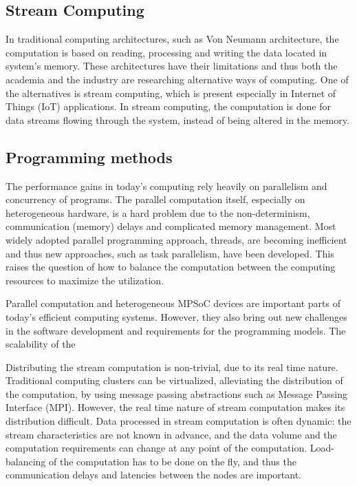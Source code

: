 \subsection{Stream Computing}
In traditional computing architectures, such as Von Neumann architecture, the computation is based on reading, processing and writing the data located in system's memory. These architectures have their limitations and thus both the academia and the industry are researching alternative ways of computing. One of the alternatives is stream computing, which is present especially in Internet of Things (IoT) applications. In stream computing, the computation is done for data streams flowing through the system, instead of being altered in the memory.

\subsection{Programming methods}
The performance gains in today's computing rely heavily on parallelism and concurrency of programs. The parallel computation itself, especially on heterogeneous hardware, is a hard problem due to the non-determinism, communication (memory) delays and complicated memory management. Most widely adopted  parallel programming approach, threads, are becoming inefficient and thus new approaches, such as task parallelism, have been developed. This raises the question of how to balance the computation between the computing resources to maximize the utilization.

Parallel computation and heterogeneous MPSoC devices are important parts of today's efficient computing systems. However, they also bring out new challenges in the software development and requirements for the programming models. The scalability of the

Distributing the stream computation is non-trivial, due to its real time nature. Traditional computing clusters can be virtualized, alleviating the distribution of the computation, by using message passing abstractions such as Message Passing Interface (MPI). However, the real time nature of stream computation makes its distribution difficult. Data processed in stream computation is often dynamic: the stream characteristics are not known in advance, and the data volume and the computation requirements can change at any point of the computation. Load-balancing of the computation has to be done on the fly, and thus the communication delays and latencies between the nodes are important.




